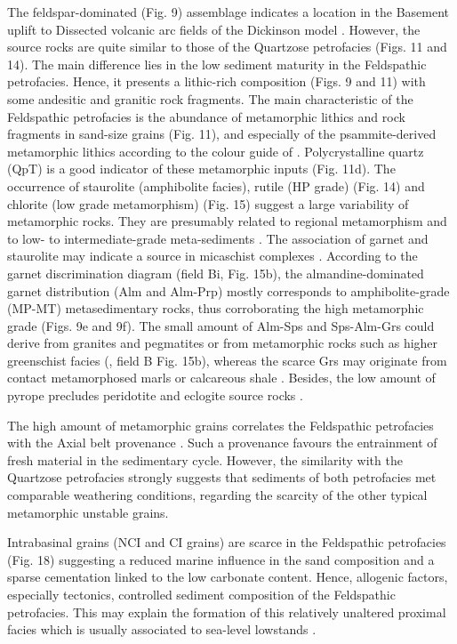 \documentclass[twoside]{article}
\begin{document}
The feldspar-dominated (Fig. 9) assemblage indicates a location in the Basement uplift to Dissected volcanic arc fields of the Dickinson model \citep{Dickinson1985,Dickinson1979a}. However, the source rocks are quite similar to those of the Quartzose petrofacies (Figs. 11 and 14). The main difference lies in the low sediment maturity in the Feldspathic petrofacies. Hence, it presents a lithic-rich composition (Figs. 9 and 11) with some andesitic and granitic rock fragments. The main characteristic of the Feldspathic petrofacies is the abundance of metamorphic lithics and rock fragments in sand-size grains (Fig. 11), and especially of the psammite-derived metamorphic lithics according to the colour guide of \citep{Garzanti2003}. Polycrystalline quartz (QpT) is a good indicator of these metamorphic inputs (Fig. 11d). The occurrence of staurolite (amphibolite facies), rutile (HP grade) (Fig. 14) and chlorite (low grade metamorphism) (Fig. 15) suggest a large variability of metamorphic rocks. They are presumably related to regional metamorphism and to low- to intermediate-grade meta-sediments \citep{Eynatten1999,Copjakova2005,Eynatten2012}. The association of garnet and staurolite may indicate a source in micaschist complexes \citep{Fuchtbauer1964}. According to the \citep{Mange2007a} garnet discrimination diagram (field Bi, Fig. 15b), the almandine-dominated garnet distribution (Alm and Alm-Prp) mostly corresponds to amphibolite-grade (MP-MT) metasedimentary rocks, thus corroborating the high metamorphic grade (Figs. 9e and 9f). The small amount of Alm-Sps and Sps-Alm-Grs could derive from granites and pegmatites or from metamorphic rocks such as higher greenschist facies (\citealp{Krippner2014}, field B Fig. 15b), whereas the scarce Grs may originate from contact metamorphosed marls or calcareous shale \citep{Win2007}. Besides, the low amount of pyrope precludes peridotite and eclogite source rocks \citep{Eynatten1999}.\par
The high amount of metamorphic grains correlates the Feldspathic petrofacies with the Axial belt provenance \citep{Garzanti2004,Garzanti2007b,Garzanti2010}. Such a provenance favours the entrainment of fresh material in the sedimentary cycle. However, the similarity with the Quartzose petrofacies strongly suggests that sediments of both petrofacies met comparable weathering conditions, regarding the scarcity of the other typical metamorphic unstable grains.\par
Intrabasinal grains (NCI and CI grains) are scarce in the Feldspathic petrofacies (Fig. 18) suggesting a reduced marine influence in the sand composition and a sparse cementation linked to the low carbonate content. Hence, allogenic factors, especially tectonics, controlled sediment composition of the Feldspathic petrofacies. This may explain the formation of this relatively unaltered proximal facies which is usually associated to sea-level lowstands \citep{Amorosi2011}.
\end{document}
